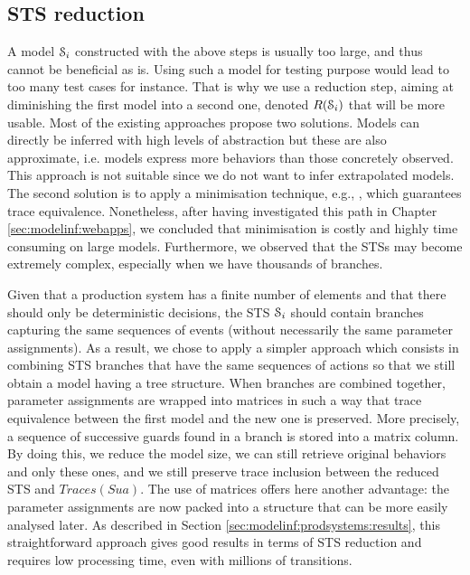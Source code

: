\subsection{STS reduction}
\label{sec:modelinf:prodsystems:reduction}

A model $\EuScript{S}_i$ constructed with the above steps is
usually too large, and thus cannot be beneficial as is. Using
such a model for testing purpose would lead to too many test
cases for instance. That is why we use a reduction step, aiming
at diminishing the first model into a second one, denoted
$R(\EuScript{S}_i)$ that will be more usable. Most of the
existing approaches propose two solutions. Models can directly be
inferred with high levels of abstraction but these are also
approximate, i.e. models express more behaviors than those
concretely observed. This approach is not suitable since we do
not want to infer extrapolated models. The second solution is to
apply a minimisation technique, e.g., \cite{Abdulla06}, which
guarantees trace equivalence. Nonetheless, after having
investigated this path in Chapter \ref{sec:modelinf:webapps}, we
concluded that minimisation is costly and highly time consuming
on large models. Furthermore, we observed that the STSs may
become extremely complex, especially when we have thousands of
branches.

Given that a production system has a finite number of elements
and that there should only be deterministic decisions, the STS
$\EuScript{S}_i$ should contain branches capturing the same
sequences of events (without necessarily the same parameter
assignments).  As a result, we chose to apply a simpler approach
which consists in combining STS branches that have the same
sequences of actions so that we still obtain a model having a
tree structure. When branches are combined together, parameter
assignments are wrapped into matrices in such a way that trace
equivalence between the first model and the new one is preserved.
More precisely, a sequence of successive guards found in a branch
is stored into a matrix column. By doing this, we reduce the
model size, we can still retrieve original behaviors and only
these ones, and we still preserve trace inclusion between the
reduced STS and $Traces(Sua)$.
The use of matrices offers here another advantage: the parameter
assignments are now packed into a structure that can be more
easily analysed later. As described in Section
\ref{sec:modelinf:prodsystems:results}, this straightforward
approach gives good results in terms of STS reduction and
requires low processing time, even with millions of transitions.


